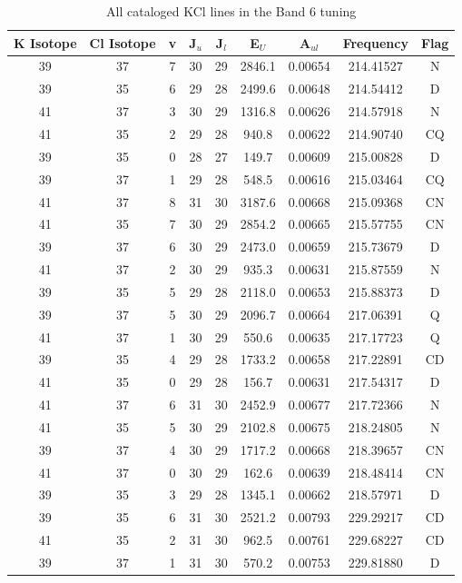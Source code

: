 \begin{table*}[htp]
\centering
\caption{All cataloged KCl lines in the Band 6 tuning}
\begin{tabular}{ccccccccc}
\label{tab:K_detections_B6}
K Isotope & Cl Isotope & v & J$_u$ & J$_l$ & E$_U$ & A$_{ul}$ & Frequency & Flag \\
\hline
39 & 37 & 7 & 30 & 29 & 2846.1 & 0.00654 & 214.41527 & N \\
39 & 35 & 6 & 29 & 28 & 2499.6 & 0.00648 & 214.54412 & D \\
41 & 37 & 3 & 30 & 29 & 1316.8 & 0.00626 & 214.57918 & N \\
41 & 35 & 2 & 29 & 28 & 940.8 & 0.00622 & 214.90740 & CQ \\
39 & 35 & 0 & 28 & 27 & 149.7 & 0.00609 & 215.00828 & D \\
39 & 37 & 1 & 29 & 28 & 548.5 & 0.00616 & 215.03464 & CQ \\
41 & 37 & 8 & 31 & 30 & 3187.6 & 0.00668 & 215.09368 & CN \\
41 & 35 & 7 & 30 & 29 & 2854.2 & 0.00665 & 215.57755 & CN \\
39 & 37 & 6 & 30 & 29 & 2473.0 & 0.00659 & 215.73679 & D \\
41 & 37 & 2 & 30 & 29 & 935.3 & 0.00631 & 215.87559 & N \\
39 & 35 & 5 & 29 & 28 & 2118.0 & 0.00653 & 215.88373 & D \\
39 & 37 & 5 & 30 & 29 & 2096.7 & 0.00664 & 217.06391 & Q \\
41 & 37 & 1 & 30 & 29 & 550.6 & 0.00635 & 217.17723 & Q \\
39 & 35 & 4 & 29 & 28 & 1733.2 & 0.00658 & 217.22891 & CD \\
41 & 35 & 0 & 29 & 28 & 156.7 & 0.00631 & 217.54317 & D \\
41 & 37 & 6 & 31 & 30 & 2452.9 & 0.00677 & 217.72366 & N \\
41 & 35 & 5 & 30 & 29 & 2102.8 & 0.00675 & 218.24805 & N \\
39 & 37 & 4 & 30 & 29 & 1717.2 & 0.00668 & 218.39657 & CN \\
41 & 37 & 0 & 30 & 29 & 162.6 & 0.00639 & 218.48414 & CN \\
39 & 35 & 3 & 29 & 28 & 1345.1 & 0.00662 & 218.57971 & D \\
39 & 35 & 6 & 31 & 30 & 2521.2 & 0.00793 & 229.29217 & CD \\
41 & 35 & 2 & 31 & 30 & 962.5 & 0.00761 & 229.68227 & CD \\
39 & 37 & 1 & 31 & 30 & 570.2 & 0.00753 & 229.81880 & D \\

\end{tabular}
\end{table*}
